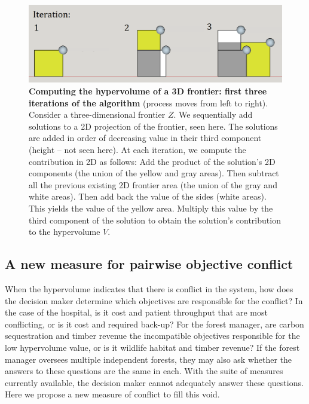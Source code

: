 \begin{figure}[ht]
\centering
\caption[First three iterations for computing the sub-dimensional hypervolume $\overbar{V}$]{\textbf{Computing the hypervolume of a 3D frontier: first three iterations of the algorithm} (process moves from left to right). Consider a three-dimensional frontier $Z$. We sequentially add solutions to a 2D projection of the frontier, seen here. The solutions are added in order of decreasing value in their third component (height -- not seen here). At each iteration, we compute the contribution in 2D as follows: Add the product of the solution's 2D components (the union of the yellow and gray areas). Then subtract all the previous existing 2D frontier area (the union of the gray and white areas). Then add back the value of the sides (white areas). This yields the value of the yellow area. Multiply this value by the third component of the solution to obtain the solution's contribution to the hypervolume $V$.}
\label{fig:AlgoAid}
\includegraphics[width=.85\textwidth]{../images/3DFrontierSchematic_SketchUp_FirstSteps_2D_clean}
\end{figure}

\subsection{A new measure for pairwise objective conflict}
\label{sec:newConflictMetric}
When the hypervolume indicates that there is conflict in the system, how does the decision maker determine which objectives are responsible for the conflict? In the case of the hospital, is it cost and patient throughput that are most conflicting, or is it cost and required back-up? For the forest manager, are carbon sequestration and timber revenue the incompatible objectives responsible for the low hypervolume value, or is it wildlife habitat and timber revenue? If the forest manager oversees multiple independent forests, they may also ask whether the answers to these questions are the same in each. With the suite of measures currently available, the decision maker cannot adequately answer these questions. Here we propose a new measure of conflict to fill this void.

